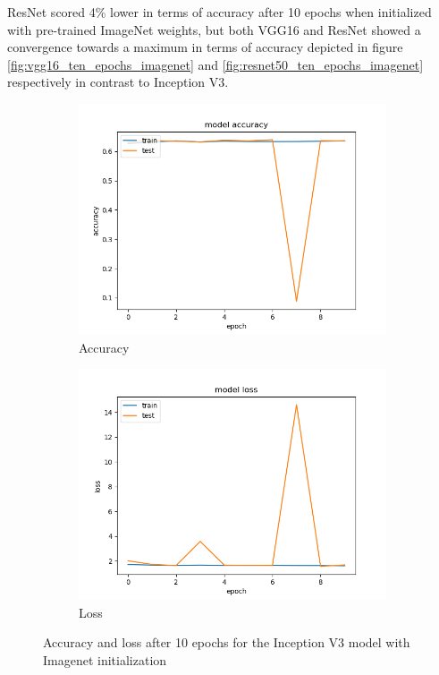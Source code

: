 \documentclass{article}
\theoremstyle{definition}
\theoremstyle{remark}
\begin{document}
ResNet scored 4\% lower in terms of accuracy after 10 epochs when initialized with pre-trained ImageNet weights, but both VGG16 and ResNet showed a convergence towards a maximum in terms of accuracy depicted in figure \ref{fig:vgg16_ten_epochs_imagenet}  and \ref{fig:resnet50_ten_epochs_imagenet} respectively in contrast to Inception V3.

\begin{figure}[h!]
\centering
\begin{subfigure}{.5\textwidth}
  \centering
  \includegraphics[width=1.2\linewidth]{img/pre-trained_models/Inception_v3_acc.png}
  \caption{Accuracy}
  \label{fig:sub1}
\end{subfigure}%
\begin{subfigure}{.5\textwidth}
  \centering
  \includegraphics[width=1.2\linewidth]{img/pre-trained_models/Inception_v3_loss.png}
  \caption{Loss}
  \label{fig:sub2}
\end{subfigure}
\caption{Accuracy and loss after 10 epochs for the Inception V3 model with Imagenet initialization}
\label{fig:inception_v3_ten_epochs_imagenet}
\end{figure}
\end{document}
